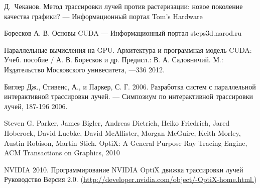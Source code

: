 \newpage
{}
\begin{thebibliography}{0}
Д.~Чеканов. Метод трассировки лучей против растеризации: новое поколение качества графики? ---
 Информационный портал Tom's Hardware

Боресков А. В. Основы CUDA ---  Информационный портал steps3d.narod.ru

Параллельные вычисления на GPU. Архитектура и программная модель CUDA: Учеб. пособие / А. В. Боресков и др. Предисл.: В. А. Садовничий. М.: Издательство Московского унивеситета, ---336 2012.

Биглер Дж., Стивенс, А., и Паркер, С. Г. 2006. Разработка систем с параллельной интерактивной трассировки лучей. --- Симпозиум по интерактивной трассировки лучей, 187-196 2006.

Steven G. Parker, James Bigler, Andreas Dietrich, Heiko Friedrich, Jared Hoberock, David Luebke,  David McAllister, Morgan McGuire, Keith Morley, Austin Robison, Martin Stich. OptiX: A General Purpose Ray Tracing Engine, ACM Transactions on Graphics, 2010

NVIDIA 2010. Программирование NVIDIA OptiX движка трассировки лучей 
Руководство Версия 2.0. (\href{http://developer.nvidia.com/object/-OptiX-home.html.}{http://developer.nvidia.com/object/-OptiX-home.html.})
\end{thebibliography}
